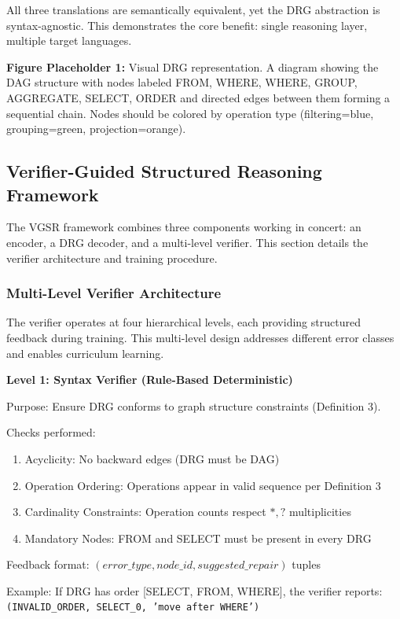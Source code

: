 \documentclass[conference]{IEEEtran}
\begin{document}
All three translations are semantically equivalent, yet the DRG abstraction is syntax-agnostic. This demonstrates the core benefit: single reasoning layer, multiple target languages.

\textbf{Figure Placeholder 1:} Visual DRG representation. A diagram showing the DAG structure with nodes labeled FROM, WHERE, WHERE, GROUP, AGGREGATE, SELECT, ORDER and directed edges between them forming a sequential chain. Nodes should be colored by operation type (filtering=blue, grouping=green, projection=orange).

\subsection{Verifier-Guided Structured Reasoning Framework}

The VGSR framework combines three components working in concert: an encoder, a DRG decoder, and a multi-level verifier. This section details the verifier architecture and training procedure.

\subsubsection{Multi-Level Verifier Architecture}

The verifier operates at four hierarchical levels, each providing structured feedback during training. This multi-level design addresses different error classes and enables curriculum learning.

\textbf{Level 1: Syntax Verifier (Rule-Based Deterministic)}

Purpose: Ensure DRG conforms to graph structure constraints (Definition 3).

Checks performed:
\begin{enumerate}
\item Acyclicity: No backward edges (DRG must be DAG)
\item Operation Ordering: Operations appear in valid sequence per Definition 3
\item Cardinality Constraints: Operation counts respect $*, ?$ multiplicities
\item Mandatory Nodes: FROM and SELECT must be present in every DRG
\end{enumerate}

Feedback format: $(error\_type, node\_id, suggested\_repair)$ tuples

Example: If DRG has order [SELECT, FROM, WHERE], the verifier reports: \texttt{(INVALID\_ORDER, SELECT\_0, 'move after WHERE')}
\end{document}
